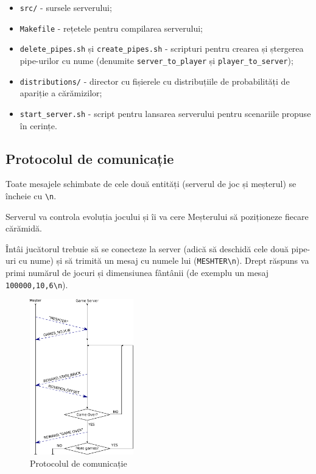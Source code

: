 \documentclass[12pt]{article}
\begin{document}
\begin{itemize}
\item \texttt{src/} - sursele serverului;
\item \texttt{Makefile} - rețetele pentru compilarea serverului;
\item \texttt{delete\_pipes.sh} și \texttt{create\_pipes.sh} -
  scripturi pentru crearea și ștergerea pipe-urilor cu nume (denumite
  \texttt{server\_to\_player} și \texttt{player\_to\_server});
\item \texttt{distributions/} - director cu fișierele cu distribuțiile
  de probabilități de apariție a cărămizilor;
\item \texttt{start\_server.sh} - script pentru lansarea serverului
  pentru scenariile propuse în cerințe.
\end{itemize}

\subsection{Protocolul de comunicație}
\label{sec:protocol-story}

Toate mesajele schimbate de cele două entități (serverul de joc și
meșterul) se încheie cu \verb|\n|.

Serverul va controla evoluția jocului și îi va cere Meșterului să
poziționeze fiecare cărămidă.

Întâi jucătorul trebuie să se conecteze la server (adică să deschidă
cele două pipe-uri cu nume) și să trimită un mesaj cu numele lui
(\verb|MESHTER\n|). Drept răspuns va primi numărul de jocuri și
dimensiunea fântânii (de exemplu un mesaj \verb|100000,10,6\n|).

\begin{figure}[h!]
  \centering
  \includegraphics[width=0.4\textwidth]{graphics/protocol.pdf}
  \caption{Protocolul de comunicație}
\label{fig:protocol}
\end{figure}
\end{document}
